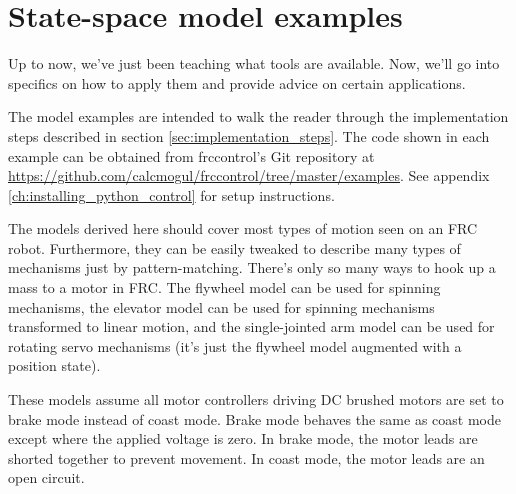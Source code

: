 
\chapter{State-space model examples}

Up to now, we've just been teaching what tools are available. Now, we'll go into
specifics on how to apply them and provide advice on certain applications.

The \gls{model} examples are intended to walk the reader through the
implementation steps described in section \ref{sec:implementation_steps}. The
code shown in each example can be obtained from frccontrol's Git repository at
\url{https://github.com/calcmogul/frccontrol/tree/master/examples}. See appendix
\ref{ch:installing_python_control} for setup instructions.

The \glspl{model} derived here should cover most types of motion seen on an FRC
robot. Furthermore, they can be easily tweaked to describe many types of
mechanisms just by pattern-matching. There's only so many ways to hook up a mass
to a motor in FRC. The flywheel \gls{model} can be used for spinning mechanisms,
the elevator \gls{model} can be used for spinning mechanisms transformed to
linear motion, and the single-jointed arm \gls{model} can be used for rotating
servo mechanisms (it's just the flywheel \gls{model} augmented with a position
\gls{state}).

These \glspl{model} assume all motor controllers driving DC brushed motors are
set to brake mode instead of coast mode. Brake mode behaves the same as coast
mode except where the applied voltage is zero. In brake mode, the motor leads
are shorted together to prevent movement. In coast mode, the motor leads are an
open circuit.








